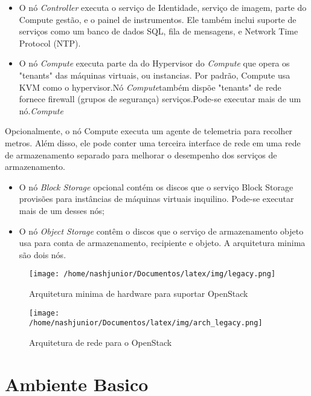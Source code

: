 \documentclass[a4paper]{book}
\begin{document}
		\begin{itemize}
			\item O nó \emph{Controller} executa o serviço de Identidade, serviço de imagem, parte do Compute gestão, e o painel de instrumentos. Ele também inclui suporte de serviços como um banco de dados SQL, fila de mensagens, e Network Time Protocol (NTP).
			\item O nó \emph{Compute} executa parte da do Hypervisor do \emph{Compute} que opera os "tenants" das máquinas virtuais, ou instancias. Por padrão, Compute usa KVM como o hypervisor.Nó \emph{Compute}também dispõe "tenants" de rede  fornece firewall (grupos de segurança) serviços.Pode-se executar mais de um nó.\emph{Compute}
		\end{itemize}
		
		Opcionalmente, o nó Compute executa um agente de telemetria para recolher metros. Além disso, ele pode conter uma terceira interface de rede em uma rede de armazenamento separado para melhorar o desempenho dos serviços de armazenamento.
		
		\begin{itemize}
			\item O nó \emph{Block Storage} opcional contém os discos que o serviço Block Storage provisões para instâncias de máquinas virtuais inquilino. Pode-se executar mais de um desses nós;
			
			\item O nó \emph{Object Storage} contêm o discos que o serviço de armazenamento objeto usa para conta de armazenamento, recipiente e objeto. A arquitetura minima são dois nós.
		\end{itemize}
		\begin{center}
			\begin{figure}
				\texttt{[image: /home/nashjunior/Documentos/latex/img/legacy.png]}
			\caption{Arquitetura minima de hardware para suportar OpenStack}
				\texttt{[image: /home/nashjunior/Documentos/latex/img/arch\_legacy.png]}
				\caption{Arquitetura de rede para o OpenStack}
			\end{figure}					
		\end{center}		

	\chapter{Ambiente Basico}
\end{document}
